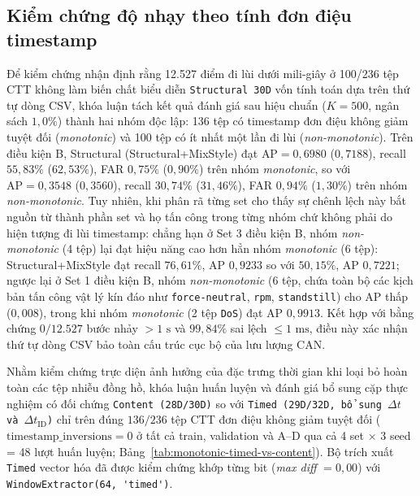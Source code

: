 \documentclass[12pt, a4paper, reqno, oneside]{book}
\DeclareRobustCommand{\code}[1]{\nolinkurl{#1}}
\begin{document}
\subsection{Kiểm chứng độ nhạy theo tính đơn điệu timestamp}\label{subsec:monotonic-sensitivity}
Để kiểm chứng nhận định rằng 12.527 điểm đi lùi dưới mili-giây ở 100/236 tệp CTT không làm biến chất biểu diễn \code{Structural 30D} vốn tính toán dựa trên thứ tự dòng CSV, khóa luận tách kết quả đánh giá sau hiệu chuẩn ($K=500$, ngân sách $1{,}0\%$) thành hai nhóm độc lập: 136 tệp có timestamp đơn điệu không giảm tuyệt đối (\textit{monotonic}) và 100 tệp có ít nhất một lần đi lùi (\textit{non-monotonic}). Trên điều kiện B, Structural (Structural+MixStyle) đạt $\text{AP}=0{,}6980$ ($0{,}7188$), recall $55{,}83\%$ ($62{,}53\%$), FAR $0{,}75\%$ ($0{,}90\%$) trên nhóm \textit{monotonic}, so với $\text{AP}=0{,}3548$ ($0{,}3560$), recall $30{,}74\%$ ($31{,}46\%$), FAR $0{,}94\%$ ($1{,}30\%$) trên nhóm \textit{non-monotonic}. Tuy nhiên, khi phân rã từng set cho thấy sự chênh lệch này bắt nguồn từ thành phần set và họ tấn công trong từng nhóm chứ không phải do hiện tượng đi lùi timestamp: chẳng hạn ở Set 3 điều kiện B, nhóm \textit{non-monotonic} (4 tệp) lại đạt hiệu năng cao hơn hẳn nhóm \textit{monotonic} (6 tệp): Structural+MixStyle đạt recall $76{,}61\%$, AP $0{,}9233$ so với $50{,}15\%$, AP $0{,}7221$; ngược lại ở Set 1 điều kiện B, nhóm \textit{non-monotonic} (6 tệp, chứa toàn bộ các kịch bản tấn công vật lý kín đáo như \code{force-neutral}, \code{rpm}, \code{standstill}) cho AP thấp ($0{,}008$), trong khi nhóm \textit{monotonic} (2 tệp \code{DoS}) đạt AP $0{,}9913$. Kết hợp với bằng chứng $0/12.527$ bước nhảy $>1\text{ s}$ và $99{,}84\%$ sai lệch $\le 1\text{ ms}$, điều này xác nhận thứ tự dòng CSV bảo toàn cấu trúc cục bộ của lưu lượng CAN.

Nhằm kiểm chứng trực diện ảnh hưởng của đặc trưng thời gian khi loại bỏ hoàn toàn các tệp nhiễu đồng hồ, khóa luận huấn luyện và đánh giá bổ sung cặp thực nghiệm có đối chứng \code{Content (28D/30D)} so với \code{Timed (29D/32D, bổ sung }$\Delta t$\code{ và }$\Delta t_{\text{ID}}$\code{)} chỉ trên đúng $136/236$ tệp CTT đơn điệu không giảm tuyệt đối ($\text{timestamp\_inversions}=0$ ở tất cả train, validation và A--D qua cả 4 set $\times$ 3 seed = 48 lượt huấn luyện; Bảng~\ref{tab:monotonic-timed-vs-content}). Bộ trích xuất \code{Timed} vector hóa đã được kiểm chứng khớp từng bit (\textit{max diff} $= 0{,}00$) với \code{WindowExtractor(64, 'timed')}.
\end{document}
